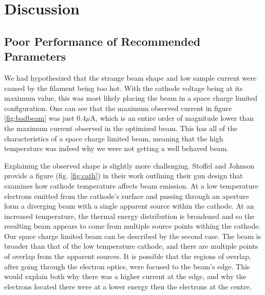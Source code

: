 \section{Discussion}

\subsection{Poor Performance of Recommended Parameters}

We had hypothesized that the strange beam shape and low sample current were caused by the filament being too hot. With the cathode voltage being at 
its maximum value, this was most likely placing the beam in a space charge limited configuration. One can see that the maximum observed current in 
figure \ref{fig:badbeam} was just $0.4\mu$A, which is an entire order of magnitude lower than the maximum current observed in the optimized beam. 
This has all of the characteristics of a space charge limited beam, meaning that the high temperature was indeed why we were not getting a well 
behaved beam. 

Explaining the observed shape is slightly more challenging. Stoffel and Johnson\cite{stoffel1985low} provide a figure (fig. \ref{fig:cath}) in their work outlining their gun design
that examines how cathode temperature affects beam emission. At a low temperature electrons emitted from the cathode's surface and passing through 
an aperture form a diverging beam with a single apparent source within the cathode. At an increased temperature, the thermal energy distribution is 
broadened and so the resulting beam appears to come from multiple source points withing the cathode. Our space charge limited beam can be described by 
the second case. The beam is broader than that of the low temperature cathode, and there are multiple points of overlap from the apparent sources. It 
is possible that the regions of overlap, after going through the electron optics, were focused to the beam's edge. This would explain both why there 
was a higher current at the edge, and why the electrons located there were at a lower energy then the electrons at the centre. 


